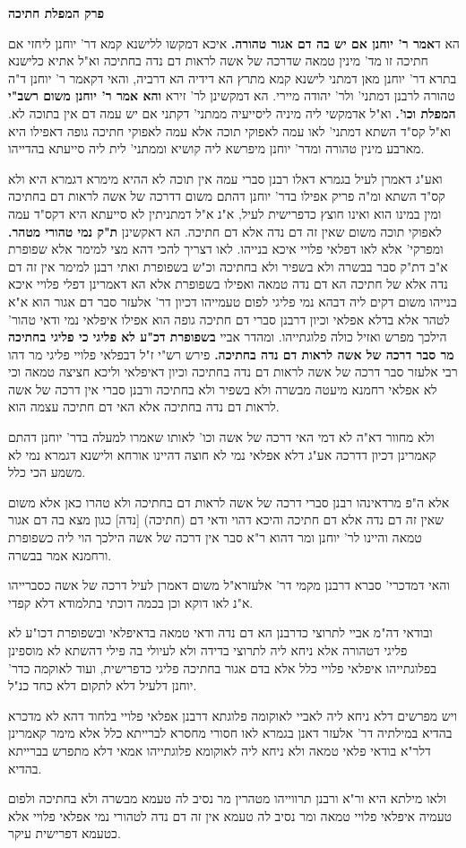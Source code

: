 \documentclass[12pt, openany]{book}
\newcommand{\sethebfont}{
\fontsize{10.5pt}{21.0pt} \selectfont
}
\newcommand{\twocol}[1]{
	{\sethebfont \begin{multicols}{2}
			#1
	\end{multicols}}	
}
\newcommand{\chapname}{}
\newcommand{\newchap}[1]{
	\addcontentsline{toc}{chapter}{#1}
	\renewcommand{\chapname}{#1}
		\begin{center}
			\textbf{%
\fontsize{16pt}{16pt}\selectfont
				#1}
		\end{center}
}
\begin{document}
\newchap{פרק  המפלת חתיכה}
\twocol{
 הא ד\textbf{אמר ר' יוחנן אם יש בה דם אגור טהורה.}  איכא דמקשו ללישנא קמא דר' יוחנן ליחזי אם חתיכה זו מד' מינין טמאה שדרכה של אשה לראות דם נדה בחתיכה וא"ל אתיא כלישנא בתרא דר' יוחנן מאן דמתני לישנא קמא מתרץ הא דידיה הא דרביה, והאי דקאמר ר' יוחנן ד"ה טהורה לרבנן דמתני' ולר' יהודה מיירי. 
 הא דמקשינן לר' זירא \textbf{והא אמר ר' יוחנן משום רשב"י המפלת וכו'.}  וא"ל אדמקשי ליה מיניה ליסייעיה ממתני' דקתני אם יש עמה דם אין בתוכה לא. וא"ל קס"ד השתא דמתני' לאו עמה לאפוקי תוכה אלא עמה לאפוקי חתיכה גופה דאפילו היא מארבע מינין טהורה ומדר' יוחנן מיפרשא ליה קושיא וממתני' לית ליה סייעתא בהדייהו.\par  ואע"ג דאמרן לעיל בגמרא דאלו רבנן סברי עמה אין תוכה לא ההיא מימרא דגמרא היא ולא קס"ד השתא ומ"ה פריק אפילו בדר' יוחנן דהתם משום דדרכה של אשה לראות דם בחתיכה ומין במינו הוא ואינו חוצץ כדפרישית לעיל, א"נ א"ל דמתניתין לא סייעתא היא דקס"ד עמה לאפוקי תוכה משום שאין זה דם נדה אלא דם חתיכה. 
 הא דאקשינן \textbf{ת"ק נמי טהורי מטהר.}  ומפרקי' אלא לאו דפלאי פלויי איכא בנייהו. לאו דצריך להכי דהא מצי למימר אלא שפופרת א"ב דת"ק סבר בבשרה ולא בשפיר ולא בחתיכה וכ"ש בשפופרת ואתי רבנן למימר אין זה דם נדה אלא של חתיכה הא דם נדה טמאה ואפילו בשפופרת אלא הא דאמרינן דפלי פלויי איכא בנייהו משום דקים ליה דבהא נמי פליגי לפום טעמייהו דכיון דר' אלעזר סבר דם אגור הוא א"א לטהר אלא בדלא אפלאי וכיון דרבנן סברי דם חתיכה גופה הוא אפילו איפלאי נמי ודאי טהור' הילכך מפרש ואזיל כולה פלוגתייהו. 
 ומהדר אביי \textbf{בשפופרת דכ"ע לא פליגי כי פליגי בחתיכה מר סבר דרכה של אשה לראות דם נדה בחתיכה.}  פירש רש"י ז"ל דבפלאי פלויי פליגי מר דהו רבי אלעזר סבר דרכה של אשה לראות דם נדה בחתיכה וכיון דאיפלאי וליכא חציצה טמאה וכי לא אפלאי רחמנא מיעטה מבשרה ולא בשפיר ולא בחתיכה ורבנן סברי אין דרכה של אשה לראות דם נדה בחתיכה אלא האי דם חתיכה עצמה הוא.\par ולא מחוור דא"ה לא דמי האי דרכה של אשה וכו' לאותו שאמרו למעלה בדר' יוחנן דהתם קאמרינן דכיון דדרכה אע"ג דלא אפלאי נמי לא חוצה דהיינו אורחא ולישנא דגמרא נמי לא משמע הכי כלל.\par אלא ה"פ מרדאינהו רבנן סברי דרכה של אשה לראות דם בחתיכה ולא טהרו כאן אלא משום שאין זה דם נדה אלא דם חתיכה והיכא דהוי ודאי דם (חתיכה) [נדה] כגון מצא בה דם אגור טמאה והיינו לר' יוחנן ומר דהוא ר"א סבר אין דרכה של אשה הילכך הוי ליה כשפופרת ורחמנא אמר בבשרה.\par והאי דמדכרי' סברא דרבנן מקמי דר' אלעזרא"ל משום דאמרן לעיל דרכה של אשה כסברייהו א"נ לאו דוקא וכן בכמה דוכתי בתלמודא דלא קפדי.\par  ובודאי דה"מ אביי לתרוצי כדרבנן הא דם נדה ודאי טמאה בדאיפלאי ובשפופרת דכו"ע לא פליגי דטהורה אלא ניחא ליה לתרוצי בדידה ולא לעיולי בה פילי דהשתא לא מוספינן בפלוגתייהו איפלאי פלויי כלל אלא בדם אגור בחתיכה פליגי כדפרישית, ועוד לאוקמה כדר' יוחנן דלעיל דלא לתקום דלא כחד כנ"ל.\par ויש מפרשים דלא ניחא ליה לאביי לאוקומה פלוגתא דרבנן אפלאי פלויי בלחוד דהא לא מדכרא בהדיא במילתיה דר' אלעזר דאנן בגמרא לאו חסורי מחסרא לברייתא כלל אלא מימר קאמרינן דלר"א בודאי פלאי טמאה ולא ניחא ליה לאוקומא פלוגתייהו אמאי דלא מתפרש בברייתא בהדיא.\par  ולאו מילתא היא ור"א ורבנן תרווייהו מטהרין מר נסיב לה טעמא מבשרה ולא בחתיכה ולפום טעמיה איפלאי פלויי טמאה ומר נסיב לה טעמא אין זה דם נדה לטהורי נמי אפלאי פלויי אלא כטעמא דפרישית עיקר. }
\end{document}
